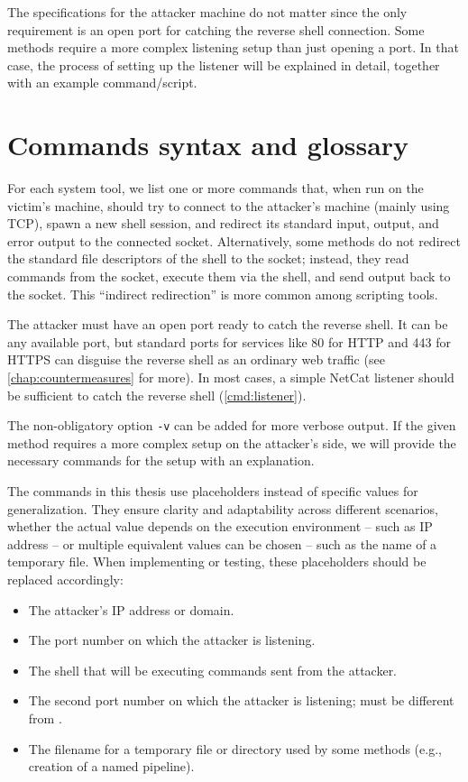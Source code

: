 The specifications for the attacker machine do not matter since the only requirement is an open port for catching the reverse shell connection. Some methods require a more complex listening setup than just opening a port. In that case, the process of setting up the listener will be explained in detail, together with an example command/script.


\section{Commands syntax and glossary}

For each system tool, we list one or more commands that, when run on the victim's machine, should try to connect to the attacker's machine (mainly using TCP), spawn a new shell session, and redirect its standard input, output, and error output to the connected socket. Alternatively, some methods do not redirect the standard file descriptors of the shell to the socket; instead, they read commands from the socket, execute them via the shell, and send output back to the socket. This ``indirect redirection'' is more common among scripting tools.

The attacker must have an open port ready to catch the reverse shell. It can be any available port, but standard ports for services like 80 for HTTP and 443 for HTTPS can disguise the reverse shell as an ordinary web traffic (see \cref{chap:countermeasures} for more). In most cases, a simple NetCat listener should be sufficient to catch the reverse shell (\cref{cmd:listener}).


The non-obligatory option \texttt{-v} can be added for more verbose output. If the given method requires a more complex setup on the attacker's side, we will provide the necessary commands for the setup with an explanation.

The commands in this thesis use placeholders instead of specific values for generalization. They ensure clarity and adaptability across different scenarios, whether the actual value depends on the execution environment -- such as IP address -- or multiple equivalent values can be chosen -- such as the name of a temporary file. When implementing or testing, these placeholders should be replaced accordingly:

\setlength{\leftmargini}{5em}
\begin{itemize}
\item[\host] The attacker's IP address or domain.
\item[\port] The port number on which the attacker is listening.
\item[\shell] The shell that will be executing commands sent from the attacker.
\item[\portt] The second port number on which the attacker is listening; must be different from \port.
\item[\tmp] The filename for a temporary file or directory used by some methods (e.g., creation of a named pipeline).
\end{itemize}
\setlength{\leftmargini}{2.5em}

